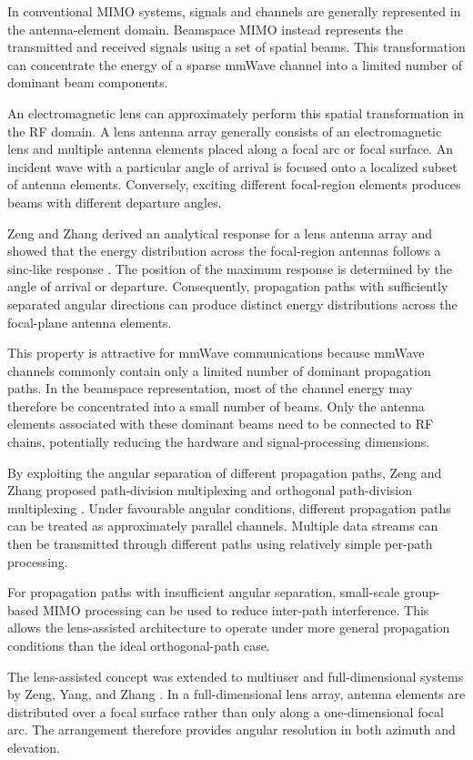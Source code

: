 In conventional MIMO systems, signals and channels are generally
represented in the antenna-element domain. Beamspace MIMO instead
represents the transmitted and received signals using a set of
spatial beams. This transformation can concentrate the energy of a
sparse mmWave channel into a limited number of dominant beam
components.

An electromagnetic lens can approximately perform this spatial
transformation in the RF domain. A lens antenna array generally
consists of an electromagnetic lens and multiple antenna elements
placed along a focal arc or focal surface. An incident wave with a
particular angle of arrival is focused onto a localized subset of
antenna elements. Conversely, exciting different focal-region
elements produces beams with different departure angles.

Zeng and Zhang derived an analytical response for a lens antenna array
and showed that the energy distribution across the focal-region
antennas follows a sinc-like response
\cite{Zeng2016}. The position of the maximum response is determined
by the angle of arrival or departure. Consequently, propagation paths
with sufficiently separated angular directions can produce distinct
energy distributions across the focal-plane antenna elements.

This property is attractive for mmWave communications because mmWave
channels commonly contain only a limited number of dominant
propagation paths. In the beamspace representation, most of the
channel energy may therefore be concentrated into a small number of
beams. Only the antenna elements associated with these dominant beams
need to be connected to RF chains, potentially reducing the hardware
and signal-processing dimensions.

By exploiting the angular separation of different propagation paths,
Zeng and Zhang proposed path-division multiplexing and orthogonal
path-division multiplexing \cite{Zeng2016}. Under favourable
angular conditions, different propagation paths can be treated as
approximately parallel channels. Multiple data streams can then be
transmitted through different paths using relatively simple per-path
processing.

For propagation paths with insufficient angular separation,
small-scale group-based MIMO processing can be used to reduce
inter-path interference. This allows the lens-assisted architecture to
operate under more general propagation conditions than the ideal
orthogonal-path case.

The lens-assisted concept was extended to multiuser and
full-dimensional systems by Zeng, Yang, and Zhang
\cite{Zeng2018}. In a full-dimensional lens array, antenna
elements are distributed over a focal surface rather than only along
a one-dimensional focal arc. The arrangement therefore provides
angular resolution in both azimuth and elevation.

